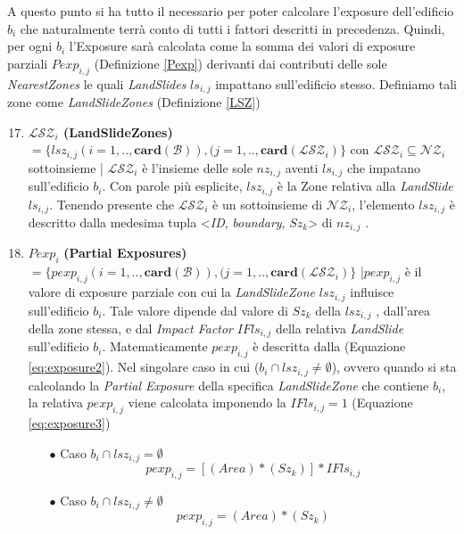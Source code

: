 \newpage 
A questo punto si ha tutto il necessario per poter calcolare l'exposure dell'edificio $b_i$ che naturalmente terrà conto di tutti i fattori descritti in precedenza. Quindi, per ogni $b_i$ l'Exposure sarà calcolata come la somma dei valori di exposure parziali $Pexp_{i,j}$ (Definizione \ref{Pexp}) derivanti dai contributi delle sole \textit{NearestZones} le quali \textit{LandSlides} $ls_{i,j}$ impattano sull'edificio stesso.
Definiamo tali zone come \textit{LandSlideZones} (Definizione \ref{LSZ})

\begin{enumerate}
	\setcounter{enumi}{16}

	\item \label{LSZ} \textbf{$ \mathcal{LSZ}_i $ (LandSlideZones)} $ = \{lsz_{i,j}(i=1,..,\mathbf{card}(\mathcal{B})),(j=1,..,\mathbf{card}(\mathcal{LSZ}_i)\}$ con $\mathcal{LSZ}_i \subseteq \mathcal{NZ}_i$  sottoinsieme | $\mathcal{LSZ}_i$ 
	è l'insieme delle sole $nz_{i,j}$ aventi $ls_{i,j}$ che impatano sull'edificio $b_i$. 
	Con parole più esplicite, $lsz_{i,j}$ è la Zone relativa alla \textit{LandSlide} $ls_{i,j}$. 
	Tenendo presente che $\mathcal{LSZ}_i$ è un sottoinsieme di $\mathcal{NZ}_i$, l'elemento $lsz_{i,j}$  è descritto dalla medesima tupla <\textit{ID}, \textit{boundary}, \textit{$Sz_k$}> di $nz_{i,j}$ . 
	
	\item \label{Pexp} $Pexp_i$ \textbf{(Partial Exposures)} $ = \{pexp_{i,j}(i=1,..,\mathbf{card}(\mathcal{B})),(j=1,..,\mathbf{card}(\mathcal{LSZ}_i)\}$ |$pexp_{i,j}$ è il valore di exposure parziale con cui la \textit{LandSlideZone} $lsz_{i,j}$ influisce sull'edificio $b_i$. Tale valore dipende dal valore di $Sz_k$ della $lsz_{i,j}$ , dall'area della zone stessa, e dal \textit{Impact Factor} $IFls_{i,j}$ della relativa \textit{LandSlide} sull'edificio $b_i$. Matematicamente $pexp_{i,j}$ è descritta dalla (Equazione \ref{eq:exposure2}). Nel singolare caso in cui ($b_i \cap lsz_{i,j} \not=\emptyset$), ovvero quando si sta calcolando la  \textit{Partial Exposure} della specifica \textit{LandSlideZone} che contiene $b_i$, la relativa $pexp_{i,j}$ viene calcolata imponendo la $IFls_{i,j}=1$ (Equazione \ref{eq:exposure3})  
	\\
	\begin{enumerate}
		\item[$\bullet$] Caso $b_i \cap lsz_{i,j}=\emptyset$
		\begin{equation}\label{eq:exposure2}
		pexp_{i,j} =[(Area)*(Sz_{k})] * IFls_{i,j}
		\end{equation}
		
		\item[$\bullet$] Caso $b_i \cap lsz_{i,j} \not=\emptyset$
		\begin{equation}\label{eq:exposure3}
		pexp_{i,j} =(Area)*(Sz_{k})
		\end{equation}
	\end{enumerate}

	
\end{enumerate}

